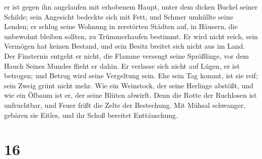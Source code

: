  er ist gegen ihn angelaufen mit erhobenem Haupt, unter
dem dicken Buckel seiner Schilde;  sein Angesicht
bedeckte sich mit Fett, und Schmer umhüllte seine Lenden;
 er schlug seine Wohnung in zerstörten Städten auf, in
Häusern, die unbewohnt bleiben sollten, zu Trümmerhaufen bestimmt.
 Er wird nicht reich, sein Vermögen hat keinen Bestand,
und sein Besitz breitet sich nicht aus im Land.  Der
Finsternis entgeht er nicht, die Flamme versengt seine Sprößlinge, vor
dem Hauch Seines Mundes flieht er dahin.  Er verlasse
sich nicht auf Lügen, er ist betrogen; und Betrug wird seine Vergeltung
sein.  Ehe sein Tag kommt, ist sie reif; sein Zweig grünt
nicht mehr.  Wie ein Weinstock, der seine Herlinge
abstößt, und wie ein Ölbaum ist er, der seine Blüten abwirft.
 Denn die Rotte der Ruchlosen ist unfruchtbar, und Feuer
frißt die Zelte der Bestechung.  Mit Mühsal schwanger,
gebären sie Eitles, und ihr Schoß bereitet Enttäuschung.

\hypertarget{section-15}{%
\section{16}\label{section-15}}

